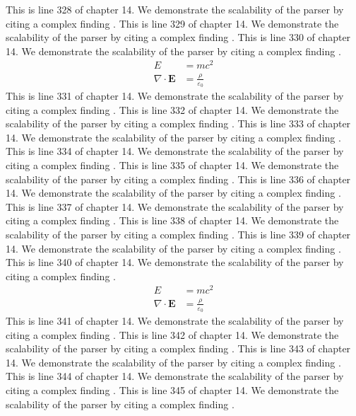 This is line 328 of chapter 14. We demonstrate the scalability of the parser by citing a complex finding \cite{ref14_328}.
This is line 329 of chapter 14. We demonstrate the scalability of the parser by citing a complex finding \cite{ref14_329}.
This is line 330 of chapter 14. We demonstrate the scalability of the parser by citing a complex finding \cite{ref14_330}.
\begin{align*}
  E &= mc^2 \\
  \nabla \cdot \mathbf{E} &= \frac{\rho}{\varepsilon_0}
\end{align*}
This is line 331 of chapter 14. We demonstrate the scalability of the parser by citing a complex finding \cite{ref14_331}.
This is line 332 of chapter 14. We demonstrate the scalability of the parser by citing a complex finding \cite{ref14_332}.
This is line 333 of chapter 14. We demonstrate the scalability of the parser by citing a complex finding \cite{ref14_333}.
This is line 334 of chapter 14. We demonstrate the scalability of the parser by citing a complex finding \cite{ref14_334}.
This is line 335 of chapter 14. We demonstrate the scalability of the parser by citing a complex finding \cite{ref14_335}.
This is line 336 of chapter 14. We demonstrate the scalability of the parser by citing a complex finding \cite{ref14_336}.
This is line 337 of chapter 14. We demonstrate the scalability of the parser by citing a complex finding \cite{ref14_337}.
This is line 338 of chapter 14. We demonstrate the scalability of the parser by citing a complex finding \cite{ref14_338}.
This is line 339 of chapter 14. We demonstrate the scalability of the parser by citing a complex finding \cite{ref14_339}.
This is line 340 of chapter 14. We demonstrate the scalability of the parser by citing a complex finding \cite{ref14_340}.
\begin{align*}
  E &= mc^2 \\
  \nabla \cdot \mathbf{E} &= \frac{\rho}{\varepsilon_0}
\end{align*}
This is line 341 of chapter 14. We demonstrate the scalability of the parser by citing a complex finding \cite{ref14_341}.
This is line 342 of chapter 14. We demonstrate the scalability of the parser by citing a complex finding \cite{ref14_342}.
This is line 343 of chapter 14. We demonstrate the scalability of the parser by citing a complex finding \cite{ref14_343}.
This is line 344 of chapter 14. We demonstrate the scalability of the parser by citing a complex finding \cite{ref14_344}.
This is line 345 of chapter 14. We demonstrate the scalability of the parser by citing a complex finding \cite{ref14_345}.
